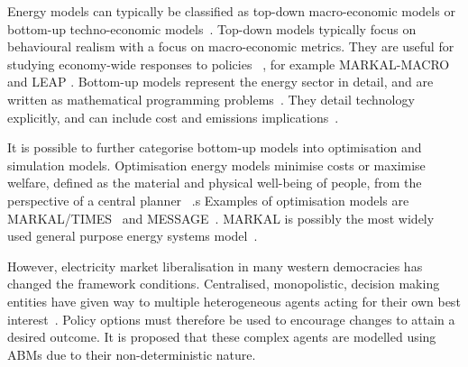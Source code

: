 
Energy models can typically be classified as top-down macro-economic models or bottom-up techno-economic models~\cite{Bohringer1998}. Top-down models typically focus on behavioural realism with a focus on macro-economic metrics. They are useful for studying economy-wide responses to policies ~\cite{Hall2016}, for example MARKAL-MACRO \cite{Fishbone1981} and LEAP \cite{Heaps2016}. Bottom-up models represent the energy sector in detail, and are written as mathematical programming problems~\cite{Gargiulo2013}. They detail technology explicitly, and can include cost and emissions implications~\cite{Hall2016}.

It is possible to further categorise bottom-up models into optimisation and simulation models. Optimisation energy models minimise costs or maximise welfare, defined as the material and physical well-being of people, from the perspective of a central planner ~\cite{Keles2017}.s Examples of optimisation models are MARKAL/TIMES~\cite{Fishbone1981} and MESSAGE~\cite{Schrattenholzer1981}. MARKAL is possibly the most widely used general purpose energy systems model~\cite{Pfenninger2014}.

However, electricity market liberalisation in many western democracies has changed the framework conditions. Centralised, monopolistic, decision making entities have given way to multiple heterogeneous agents acting for their own best interest~\cite{Most2010}. Policy options must therefore be used to encourage changes to attain a desired outcome. It is proposed that these complex agents are modelled using ABMs due to their non-deterministic nature. 

